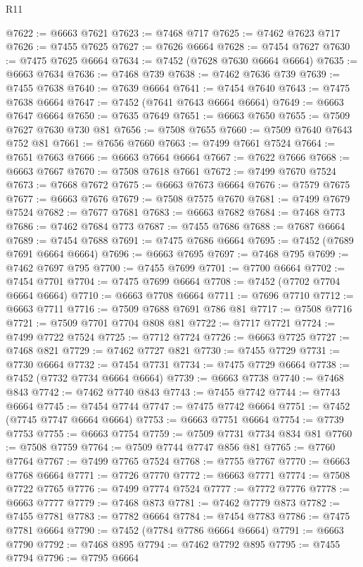 \begin{lexlean}{R11}
\begin{coremodule}
{{{{{{{{{{{{{{{{{{{{{{{{{{{{{{{{{{{{{{{{{{{{{{{{{{{{{{{{{{{{{{{{{{{{{{{{{{{{{{{{{{@7622 := @6663 @7621
@7623 := @7468 @717
@7625 := @7462 @7623 @717
@7626 := @7455 @7625
@7627 := @7626 @6664
@7628 := @7454 @7627
@7630 := @7475 @7625 @6664
@7634 := @7452 (@7628 @7630 @6664 @6664)
@7635 := @6663 @7634
@7636 := @7468 @739
@7638 := @7462 @7636 @739
@7639 := @7455 @7638
@7640 := @7639 @6664
@7641 := @7454 @7640
@7643 := @7475 @7638 @6664
@7647 := @7452 (@7641 @7643 @6664 @6664)
@7649 := @6663 @7647 @6664
@7650 := @7635 @7649
@7651 := @6663 @7650
@7655 := @7509 @7627 @7630 @730 @81
@7656 := @7508 @7655
@7660 := @7509 @7640 @7643 @752 @81
@7661 := @7656 @7660
@7663 := @7499 @7661 @7524
@7664 := @7651 @7663
@7666 := @6663 @7664 @6664
@7667 := @7622 @7666
@7668 := @6663 @7667
@7670 := @7508 @7618 @7661
@7672 := @7499 @7670 @7524
@7673 := @7668 @7672
@7675 := @6663 @7673 @6664
@7676 := @7579 @7675
@7677 := @6663 @7676
@7679 := @7508 @7575 @7670
@7681 := @7499 @7679 @7524
@7682 := @7677 @7681
@7683 := @6663 @7682
@7684 := @7468 @773
@7686 := @7462 @7684 @773
@7687 := @7455 @7686
@7688 := @7687 @6664
@7689 := @7454 @7688
@7691 := @7475 @7686 @6664
@7695 := @7452 (@7689 @7691 @6664 @6664)
@7696 := @6663 @7695
@7697 := @7468 @795
@7699 := @7462 @7697 @795
@7700 := @7455 @7699
@7701 := @7700 @6664
@7702 := @7454 @7701
@7704 := @7475 @7699 @6664
@7708 := @7452 (@7702 @7704 @6664 @6664)
@7710 := @6663 @7708 @6664
@7711 := @7696 @7710
@7712 := @6663 @7711
@7716 := @7509 @7688 @7691 @786 @81
@7717 := @7508 @7716
@7721 := @7509 @7701 @7704 @808 @81
@7722 := @7717 @7721
@7724 := @7499 @7722 @7524
@7725 := @7712 @7724
@7726 := @6663 @7725
@7727 := @7468 @821
@7729 := @7462 @7727 @821
@7730 := @7455 @7729
@7731 := @7730 @6664
@7732 := @7454 @7731
@7734 := @7475 @7729 @6664
@7738 := @7452 (@7732 @7734 @6664 @6664)
@7739 := @6663 @7738
@7740 := @7468 @843
@7742 := @7462 @7740 @843
@7743 := @7455 @7742
@7744 := @7743 @6664
@7745 := @7454 @7744
@7747 := @7475 @7742 @6664
@7751 := @7452 (@7745 @7747 @6664 @6664)
@7753 := @6663 @7751 @6664
@7754 := @7739 @7753
@7755 := @6663 @7754
@7759 := @7509 @7731 @7734 @834 @81
@7760 := @7508 @7759
@7764 := @7509 @7744 @7747 @856 @81
@7765 := @7760 @7764
@7767 := @7499 @7765 @7524
@7768 := @7755 @7767
@7770 := @6663 @7768 @6664
@7771 := @7726 @7770
@7772 := @6663 @7771
@7774 := @7508 @7722 @7765
@7776 := @7499 @7774 @7524
@7777 := @7772 @7776
@7778 := @6663 @7777
@7779 := @7468 @873
@7781 := @7462 @7779 @873
@7782 := @7455 @7781
@7783 := @7782 @6664
@7784 := @7454 @7783
@7786 := @7475 @7781 @6664
@7790 := @7452 (@7784 @7786 @6664 @6664)
@7791 := @6663 @7790
@7792 := @7468 @895
@7794 := @7462 @7792 @895
@7795 := @7455 @7794
@7796 := @7795 @6664
}}}}}}}}}}}}}}}}}}}}}}}}}}}}}}}}}}}}}}}}}}}}}}}}}}}}}}}}}}}}}}}}}}}}}}}}}}}}}}}}}}
\end{coremodule}
\end{lexlean}

